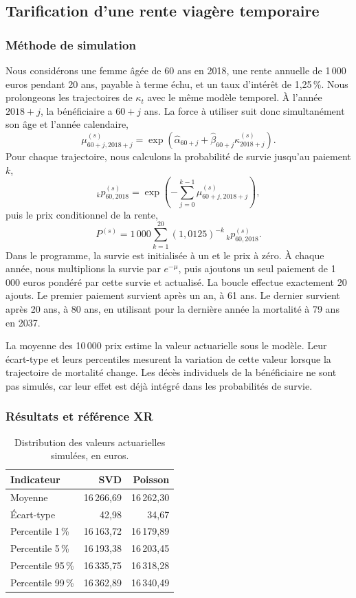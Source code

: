 \documentclass[11pt,a4paper]{article}
\begin{document}
\newpage
\subsection{Tarification d'une rente viagère temporaire}
\subsubsection{Méthode de simulation}

Nous considérons une femme âgée de 60 ans en 2018, une rente annuelle de 1\,000 euros pendant 20 ans, payable à terme échu, et un taux d'intérêt de 1,25\,\%. Nous prolongeons les trajectoires de $\kappa_t$ avec le même modèle temporel. À l'année $2018+j$, la bénéficiaire a $60+j$ ans. La force à utiliser suit donc simultanément son âge et l'année calendaire,
\[
\mu_{60+j,2018+j}^{(s)}=
\exp\left(\widehat\alpha_{60+j}+\widehat\beta_{60+j}\kappa_{2018+j}^{(s)}\right).
\]
Pour chaque trajectoire, nous calculons la probabilité de survie jusqu'au paiement $k$,
\[
{}_kp_{60,2018}^{(s)}=
\exp\left(-\sum_{j=0}^{k-1}\mu_{60+j,2018+j}^{(s)}\right),
\]
puis le prix conditionnel de la rente,
\[
P^{(s)}=1\,000\sum_{k=1}^{20}(1,0125)^{-k}\,{}_kp_{60,2018}^{(s)}.
\]
Dans le programme, la survie est initialisée à un et le prix à zéro. À chaque année, nous multiplions la survie par $e^{-\mu}$, puis ajoutons un seul paiement de 1\,000 euros pondéré par cette survie et actualisé. La boucle effectue exactement 20 ajouts. Le premier paiement survient après un an, à 61 ans. Le dernier survient après 20 ans, à 80 ans, en utilisant pour la dernière année la mortalité à 79 ans en 2037.

La moyenne des 10\,000 prix estime la valeur actuarielle sous le modèle. Leur écart-type et leurs percentiles mesurent la variation de cette valeur lorsque la trajectoire de mortalité change. Les décès individuels de la bénéficiaire ne sont pas simulés, car leur effet est déjà intégré dans les probabilités de survie.

\subsubsection{Résultats et référence XR}
\begin{table}[H]\centering\small
\caption{Distribution des valeurs actuarielles simulées, en euros.}
\begin{tabular}{lrr}\toprule
Indicateur & SVD & Poisson\\\midrule
Moyenne & 16\,266,69 & 16\,262,30\\
Écart-type & 42,98 & 34,67\\
Percentile 1\,\% & 16\,163,72 & 16\,179,89\\
Percentile 5\,\% & 16\,193,38 & 16\,203,45\\
Percentile 95\,\% & 16\,335,75 & 16\,318,28\\
Percentile 99\,\% & 16\,362,89 & 16\,340,49\\\bottomrule
\end{tabular}\label{tab:rentes}
\end{table}
\end{document}
